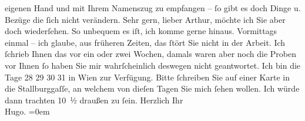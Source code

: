 \begin{ledgroupsized}[t]{13cm}
               eigenen Hand und mit Ihrem Namenszug zu empfangen – ſo gibt es doch Dinge u. Bezüge
               die ſich nicht verändern.\pend
           \pstart
           Sehr gern, lieber Arthur, möchte ich Sie aber doch wiederſehen. So unbequem es iſt,
               ich komme gerne {\pb}hinaus.
               Vormittags einmal – ich glaube, aus früheren Zeiten, das ſtört Sie nicht in der
               Arbeit.\pend
           \pstart
           Ich ſchrieb Ihnen das vor ein oder zwei Wochen, damals waren aber noch die Proben vor Ihnen ſo haben Sie
               mir wahrſcheinlich deswegen nicht geantwortet.\pend
           \pstart
           Ich bin die Tage 28{ }29{ }30{ }31 in Wien zur Verfügung. Bitte
               ſchreiben {\pb}Sie auf einer Karte in
               die Stallburggaſſe, an welchem von dieſen Tagen
               Sie mich ſehen wollen.\pend
           \pstart
           Ich würde dann trachten 10 ½ draußen zu ſein.\pend
           \pstart
           Herzlich Ihr{\\[\baselineskip]}\spacefill\mbox{Hugo.}\pend
           \leftskip=0em{}
         
         \endnumbering{}\end{ledgroupsized}  \newcommand{\dateiname}{L02317}\newcommand{\titel}{Hugo von Hofmannsthal an Arthur Schnitzler, 21. 12. [1918?]}\newcommand{\editorInnen}{Martin Anton Müller und Gerd-Hermann Susen}
      